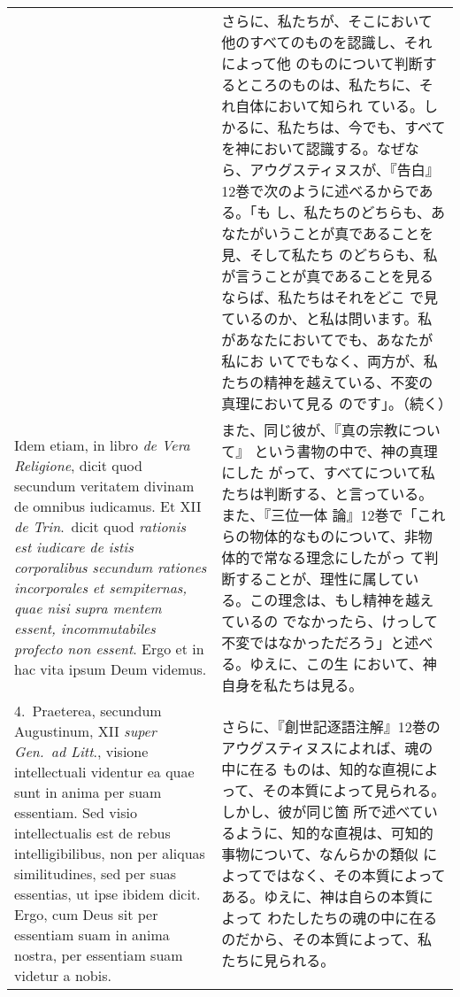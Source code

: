 \documentclass[10pt]{jsarticle} %
\begin{document}
\begin{longtable}{p{21em}p{21em}}
&

さらに、私たちが、そこにおいて他のすべてのものを認識し、それによって他
のものについて判断するところのものは、私たちに、それ自体において知られ
ている。しかるに、私たちは、今でも、すべてを神において認識する。なぜな
ら、アウグスティヌスが、『告白』12巻で次のように述べるからである。「も
し、私たちのどちらも、あなたがいうことが真であることを見、そして私たち
のどちらも、私が言うことが真であることを見るならば、私たちはそれをどこ
で見ているのか、と私は問います。私があなたにおいてでも、あなたが私にお
いてでもなく、両方が、私たちの精神を越えている、不変の真理において見る
のです」。（続く）

\\

Idem etiam, in
 libro {\it de Vera Religione}, dicit quod secundum veritatem divinam de
 omnibus iudicamus. Et XII {\it de Trin}.~dicit quod {\it rationis est iudicare de
 istis corporalibus secundum rationes incorporales et sempiternas, quae
 nisi supra mentem essent, incommutabiles profecto non essent}. Ergo et
 in hac vita ipsum Deum videmus.


&

また、同じ彼が、『真の宗教について』 という書物の中で、神の真理にした
がって、すべてについて私たちは判断する、と言っている。また、『三位一体
論』12巻で「これらの物体的なものについて、非物体的で常なる理念にしたがっ
て判断することが、理性に属している。この理念は、もし精神を越えているの
でなかったら、けっして不変ではなかっただろう」と述べる。ゆえに、この生
において、神自身を私たちは見る。


\\




4.~{\sc  Praeterea}, secundum Augustinum, XII {\it super Gen.~ad Litt}.,
 visione intellectuali videntur ea quae sunt in anima per suam
 essentiam. Sed visio intellectualis est de rebus intelligibilibus, non
 per aliquas similitudines, sed per suas essentias, ut ipse ibidem
 dicit. Ergo, cum Deus sit per essentiam suam in anima nostra, per
 essentiam suam videtur a nobis.


&

さらに、『創世記逐語注解』12巻のアウグスティヌスによれば、魂の中に在る
ものは、知的な直視によって、その本質によって見られる。しかし、彼が同じ箇
所で述べているように、知的な直視は、可知的事物について、なんらかの類似
によってではなく、その本質によってある。ゆえに、神は自らの本質によって
わたしたちの魂の中に在るのだから、その本質によって、私たちに見られる。


\end{longtable}
\end{document}

